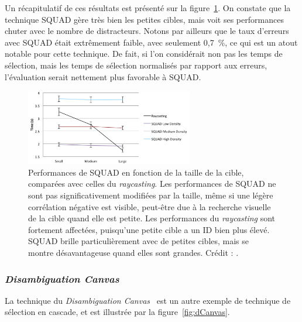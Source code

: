 	Un récapitulatif de ces résultats est présenté sur la figure~\ref{fig:squadRecap}. On constate que la technique SQUAD gère très bien les petites cibles, mais voit ses performances chuter avec le nombre de distracteurs. Notons par ailleurs que le taux d'erreurs avec SQUAD était extrêmement faible, avec seulement 0,7~\%{}, ce qui est un atout notable pour cette technique. De fait, si l'on considérait non pas les temps de sélection, mais les temps de sélection normalisés par rapport aux erreurs, l'évaluation serait nettement plus favorable à SQUAD.
	
	\begin{figure}[!htb]
		\centering
		\includegraphics[width=0.65\textwidth]{figures/ch2/squadRecap}
		\caption[SQUAD -- résultats : taille]{Performances de SQUAD en fonction de la taille de la cible, comparées avec celles du \emph{raycasting}. Les performances de SQUAD ne sont pas significativement modifiées par la taille, même si une légère corrélation négative est visible, peut-être due à la recherche visuelle de la cible quand elle est petite. Les performances du \emph{raycasting} sont fortement affectées, puisqu'une petite cible a un ID bien plus élevé. SQUAD brille particulièrement avec de petites cibles, mais se montre désavantageuse quand elles sont grandes. Crédit : \cite{kopper2011rapid}.}
		\label{fig:squadRecap}
	\end{figure}
	
	\subsubsection{\emph{Disambiguation Canvas}}
	La technique du \emph{Disambiguation Canvas}~\cite{debarba2013disambiguation} est un autre exemple de technique de sélection en cascade, et est illustrée par la figure~\ref{fig:dCanvas}.
		 
